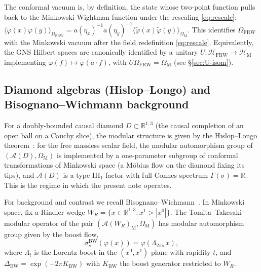 \documentclass[11pt]{article}
\theoremstyle{definition}
\newcommand{\R}{\mathbb{R}}
\newcommand{\HH}{\mathcal{H}}
\renewcommand{\AA}{\mathcal{A}}
\newcommand{\BW}{\mathrm{BW}}
\newcommand{\FRW}{\mathrm{FRW}}
\newcommand{\Mink}{\mathrm{M}}
\begin{document}
The conformal vacuum is, by definition, the state whose two-point function pulls back to the Minkowski Wightman function under the rescaling \eqref{eq:rescale}: $\langle \varphi(x)\varphi(y)\rangle_{\Omega_\FRW} = a(\eta_x)^{-1} a(\eta_y)^{-1} \langle \tilde\varphi(x)\tilde\varphi(y)\rangle_{\Omega_\Mink}$. This identifies $\Omega_\FRW$ with the Minkowski vacuum after the field redefinition \eqref{eq:rescale}. Equivalently, the GNS Hilbert spaces are canonically identified by a unitary $U:\HH_\FRW\to\HH_\Mink$ implementing $\varphi(f)\mapsto \tilde\varphi(a\cdot f)$, with $U\Omega_\FRW=\Omega_\Mink$ (see \S\ref{sec:U-isom}).

\subsection{Diamond algebras (Hislop--Longo) and Bisognano--Wichmann background}\label{sec:BW}

For a doubly-bounded causal diamond $D \subset \R^{1,3}$ (the causal completion of an open ball on a Cauchy slice), the modular structure is given by the Hislop--Longo theorem~\cite{HislopLongo1982}: for the free massless scalar field, the modular automorphism group of $(\AA(D), \Omega_\Mink)$ is implemented by a one-parameter subgroup of conformal transformations of Minkowski space (a M\"obius flow on the diamond fixing its tips), and $\AA(D)$ is a type III$_1$ factor with full Connes spectrum $\Gamma(\sigma)=\R$. This is the regime in which the present note operates.

For background and contrast we recall Bisognano--Wichmann~\cite{BisognanoWichmann1975, BisognanoWichmann1976}. In Minkowski space, fix a Rindler wedge $W_R = \{x \in \R^{1,3} : x^1 > |x^0|\}$. The Tomita--Takesaki modular operator of the pair $(\AA(W_R)_\Mink, \Omega_\Mink)$ has modular automorphism group given by the boost flow,
\begin{equation}
\label{eq:BW}
\sigma_s^\BW(\varphi(x)) = \varphi(\Lambda_{2\pi s}\,x),
\end{equation}
where $\Lambda_t$ is the Lorentz boost in the $(x^0,x^1)$-plane with rapidity $t$, and $\Delta_\BW = \exp(-2\pi K_\BW)$ with $K_\BW$ the boost generator restricted to $W_R$.

\smallskip
\end{document}
